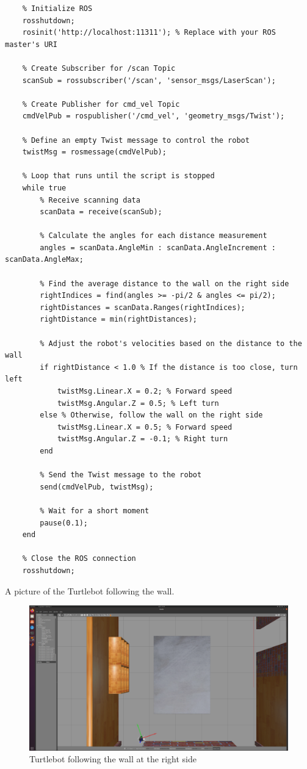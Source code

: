 \documentclass[12pt,a4paper]{article}
\begin{document}
	\begin{verbatim}
	% Initialize ROS
	rosshutdown;
	rosinit('http://localhost:11311'); % Replace with your ROS master's URI
	
	% Create Subscriber for /scan Topic
	scanSub = rossubscriber('/scan', 'sensor_msgs/LaserScan');
	
	% Create Publisher for cmd_vel Topic
	cmdVelPub = rospublisher('/cmd_vel', 'geometry_msgs/Twist');
	
	% Define an empty Twist message to control the robot
	twistMsg = rosmessage(cmdVelPub);
	
	% Loop that runs until the script is stopped
	while true
		% Receive scanning data
		scanData = receive(scanSub);
		
		% Calculate the angles for each distance measurement
		angles = scanData.AngleMin : scanData.AngleIncrement : scanData.AngleMax;
		
		% Find the average distance to the wall on the right side
		rightIndices = find(angles >= -pi/2 & angles <= pi/2);
		rightDistances = scanData.Ranges(rightIndices);
		rightDistance = min(rightDistances);
		
		% Adjust the robot's velocities based on the distance to the wall
		if rightDistance < 1.0 % If the distance is too close, turn left
			twistMsg.Linear.X = 0.2; % Forward speed
			twistMsg.Angular.Z = 0.5; % Left turn
		else % Otherwise, follow the wall on the right side
			twistMsg.Linear.X = 0.5; % Forward speed
			twistMsg.Angular.Z = -0.1; % Right turn
		end
		
		% Send the Twist message to the robot
		send(cmdVelPub, twistMsg);
		
		% Wait for a short moment
		pause(0.1);
	end
	
	% Close the ROS connection
	rosshutdown;
	\end{verbatim}
	A picture of the Turtlebot following the wall.
	\begin{figure}[!h]
		\centering
		\includegraphics[width=\linewidth]{fig6.png}
		\caption{Turtlebot following the wall at the right side}
		\label{fig:fig6}
	\end{figure}
\end{document}

